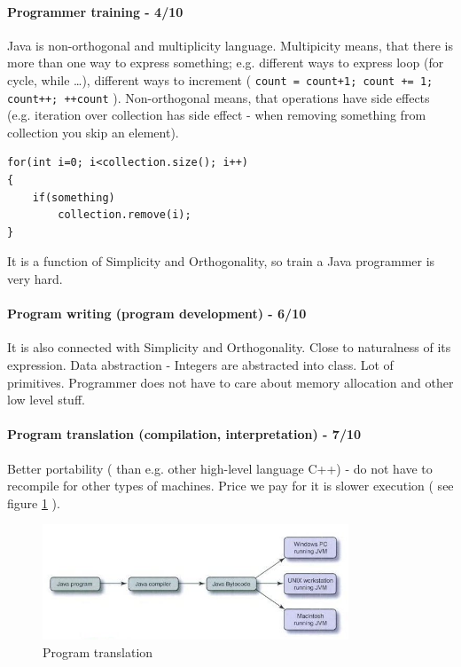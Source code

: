 \documentclass[5pt]{article}
\begin{document}
\maketitle


\paragraph{Programmer training - 4/10}
Java is non-orthogonal and multiplicity language. Multipicity means, that there
is more than one way to express something; e.g. different ways to express loop
(for cycle, while \ldots), different ways to increment (
\verb|count = count+1; count += 1; count++; ++count| ). Non-orthogonal means,
that operations have side effects (e.g. iteration over collection has side
effect - when removing something from collection you skip an element).


\begin{verbatim}
for(int i=0; i<collection.size(); i++)
{
    if(something)
        collection.remove(i);
}\end{verbatim}


It is a function of Simplicity and Orthogonality, so train a Java programmer is
very hard.

\paragraph{Program writing (program development) - 6/10}
It is also connected with Simplicity and Orthogonality. Close to naturalness of
its expression. Data abstraction - Integers are abstracted into class. Lot of
primitives. Programmer does not have to care about memory allocation and other
low level stuff.

\paragraph{Program translation (compilation, interpretation) - 7/10}
Better portability ( than e.g. other high-level language C++) - do not have to
recompile for other types of machines. Price we pay for it is slower execution
( see figure \ref{fig:translation} ).

\begin{figure}[ht]
  \centering
  \includegraphics[height=1.35in,width=3.6in]{img/program_translation}
  \caption{Program translation}
  \label{fig:translation}
\end{figure}
\end{document}
